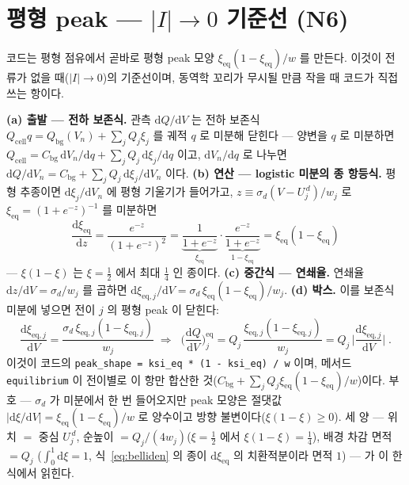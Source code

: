 \documentclass[11pt,a4paper]{article}
\newcommand{\dd}{\mathrm{d}}
\newcommand{\eq}{\mathrm{eq}}
\newcommand{\cell}{\mathrm{cell}}
\newcommand{\bg}{\mathrm{bg}}
\newcommand{\code}[1]{\texttt{#1}}
\begin{document}
\section{평형 peak — $|I|\to0$ 기준선 (N6)}\label{sec:eqpeak}
코드는 평형 점유에서 곧바로 평형 peak 모양 $\xi_\eq(1-\xi_\eq)/w$ 를 만든다. 이것이 전류가 없을 때($|I|\to0$)의
기준선이며, 동역학 꼬리가 무시될 만큼 작을 때 코드가 직접 쓰는 항이다.

\textbf{(a) 출발 — 전하 보존식.} 관측 $\dd Q/\dd V$ 는 전하 보존식 $Q_\cell q=Q_\bg(V_n)+\sum_jQ_j\xi_j$ 를 궤적
$q$ 로 미분해 닫힌다 — 양변을 $q$ 로 미분하면 $Q_\cell=C_\bg\,\dd V_n/\dd q+\sum_jQ_j\,\dd\xi_j/\dd q$ 이고,
$\dd V_n/\dd q$ 로 나누면 $\dd Q/\dd V_n=C_\bg+\sum_jQ_j\,\dd\xi_j/\dd V_n$ 이다. \textbf{(b) 연산 — logistic
미분의 종 항등식.} 평형 추종이면 $\dd\xi_j/\dd V_n$ 에 평형 기울기가 들어가고, $z\equiv\sigma_d(V-U_j^{\,d})/w_j$ 로
$\xi_\eq=(1+e^{-z})^{-1}$ 를 미분하면
\begin{equation}
\frac{\dd\xi_\eq}{\dd z}=\frac{e^{-z}}{(1+e^{-z})^2}
=\underbrace{\frac{1}{1+e^{-z}}}_{\xi_\eq}\cdot\underbrace{\frac{e^{-z}}{1+e^{-z}}}_{1-\xi_\eq}
=\xi_\eq(1-\xi_\eq)
\label{eq:belliden}
\end{equation}
— $\xi(1-\xi)$ 는 $\xi=\tfrac12$ 에서 최대 $\tfrac14$ 인 종이다. \textbf{(c) 중간식 — 연쇄율.} 연쇄율
$\dd z/\dd V=\sigma_d/w_j$ 를 곱하면 $\dd\xi_{\eq,j}/\dd V=\sigma_d\,\xi_\eq(1-\xi_\eq)/w_j$. \textbf{(d) 박스.}
이를 보존식 미분에 넣으면 전이 $j$ 의 평형 peak 이 닫힌다:
\begin{equation}
\frac{\dd\xi_{\eq,j}}{\dd V}=\frac{\sigma_d\,\xi_{\eq,j}(1-\xi_{\eq,j})}{w_j}
\;\Longrightarrow\;
\boxed{\;\Big(\frac{\dd Q}{\dd V}\Big)^\eq_j
=Q_j\,\frac{\xi_{\eq,j}(1-\xi_{\eq,j})}{w_j}
=Q_j\,\Big|\frac{\dd\xi_{\eq,j}}{\dd V}\Big|\;.}
\label{eq:eqpeak}
\end{equation}
이것이 코드의 \code{peak\_shape = ksi\_eq * (1 - ksi\_eq) / w} 이며, 메서드 \code{equilibrium} 이 전이별로 이 항만
합산한 것($C_\bg+\sum_jQ_j\xi_\eq(1-\xi_\eq)/w$)이다. 부호 — $\sigma_d$ 가 미분에서 한 번 들어오지만 peak 모양은
절댓값 $|\dd\xi/\dd V|=\xi_\eq(1-\xi_\eq)/w$ 로 양수이고 방향 불변이다($\xi(1-\xi)\ge0$). 세 양 — 위치 $=$ 중심
$U_j^{\,d}$, 순높이 $=Q_j/(4w_j)$($\xi=\tfrac12$ 에서 $\xi(1-\xi)=\tfrac14$), 배경 차감 면적 $=Q_j$
($\int_0^1\dd\xi=1$, 식~\eqref{eq:belliden} 의 종이 $\dd\xi_\eq$ 의 치환적분이라 면적 $1$) — 가 이 한 식에서 읽힌다.
\end{document}
